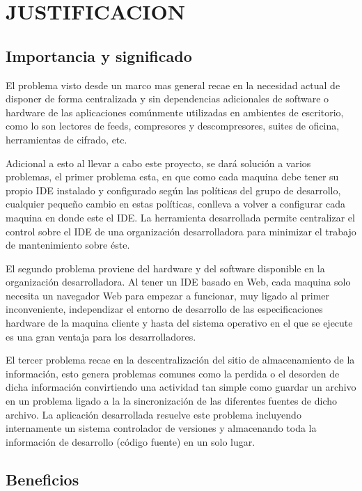 \section{JUSTIFICACION}


\subsection{Importancia y significado}

El problema visto desde un marco mas general recae en la necesidad actual de disponer de forma centralizada y sin dependencias adicionales de software o hardware de las aplicaciones comúnmente utilizadas en ambientes de escritorio, como lo son lectores de feeds, compresores y descompresores, suites de oficina, herramientas de cifrado, etc.

Adicional a esto al llevar a cabo este proyecto, se dará solución a varios problemas, el primer problema esta, en que como cada maquina debe tener su propio IDE instalado y configurado según las políticas del grupo de desarrollo, cualquier pequeño cambio en estas políticas, conlleva a volver a configurar cada maquina en donde este el IDE. La herramienta desarrollada permite centralizar el control sobre el IDE de una organización desarrolladora para minimizar el trabajo de mantenimiento sobre éste.

El segundo problema proviene del hardware y del software disponible en la organización desarrolladora. Al tener un IDE basado en Web, cada maquina solo necesita un navegador Web para empezar a funcionar, muy ligado al primer inconveniente, independizar el entorno de desarrollo de las especificaciones hardware de la maquina cliente y hasta del sistema operativo en el que se ejecute es una gran ventaja para los desarrolladores.

El tercer problema recae en la descentralización del sitio de almacenamiento de la información, esto genera problemas comunes como la perdida o el desorden de dicha información convirtiendo una actividad tan simple como guardar un archivo en un problema ligado a la la sincronización de las diferentes fuentes de dicho archivo. La aplicación desarrollada resuelve este problema incluyendo internamente un sistema controlador de versiones y almacenando toda la información de desarrollo (código fuente) en un solo lugar.


\subsection{Beneficios}

